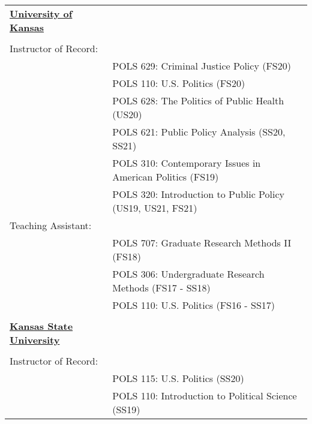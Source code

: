 \documentclass[margin,line,pifont,palatino,courier]{res}
\begin{document}
\begin{resume}
\begin{tabular}{ll}
  \textbf{\underline{University of Kansas}} & \tabularnewline
  & \tabularnewline
    Instructor of Record: & \tabularnewline
  & POLS 629: Criminal Justice Policy (FS20)\tabularnewline
  & POLS 110: U.S. Politics (FS20)\tabularnewline
  & POLS 628: The Politics of Public Health (US20)\tabularnewline
  & POLS 621: Public Policy Analysis (SS20, SS21)\tabularnewline
  & POLS 310: Contemporary Issues in American Politics (FS19)\tabularnewline
  & POLS 320: Introduction to Public Policy (US19, US21, FS21)\tabularnewline
    Teaching Assistant: & \tabularnewline
  & POLS 707: Graduate Research Methods II (FS18)\tabularnewline
  & POLS 306: Undergraduate Research Methods (FS17 - SS18)\tabularnewline
  & POLS 110: U.S. Politics (FS16 - SS17)\tabularnewline
  & \tabularnewline
    \textbf{\underline{Kansas State University}} & \tabularnewline
  & \tabularnewline
    Instructor of Record: & \tabularnewline
  & POLS 115: U.S. Politics (SS20)\tabularnewline
  & POLS 110: Introduction to Political Science (SS19)\tabularnewline
\end{tabular}



\end{resume}
\end{document}
